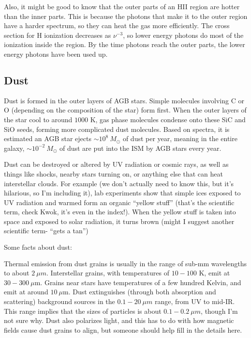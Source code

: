 Also, it might be good to know that the outer parts of an HII region are hotter than the inner 
parts.  This is because the photons that make it to the outer region have a harder spectrum, so 
they can heat the gas more efficiently.  The cross section for H ionization decreases as 
$\nu^{-3}$, so lower energy photons do most of the ionization inside the region.  By the time 
photons reach the outer parts, the lower energy photons have been used up.  

\subsection{Dust}
Dust is formed in the outer layers of AGB stars.  Simple molecules involving 
C or O (depending on the composition of the star) form first.  When the outer 
layers of the star cool to around $1000$ K, gas phase molecules condense onto 
these SiC and SiO seeds, forming more complicated dust molecules.  Based on 
spectra, it is estimated an AGB star ejects $\sim10^8\ M_{\odot}$ of dust 
per year, meaning in the entire galaxy, $\sim10^{-2}\ M_{\odot}$ of dust 
are put into the ISM by AGB stars every year.  

Dust can be destroyed or altered by UV radiation or cosmic rays, as well 
as things like shocks, nearby stars turning on, or anything else that can heat 
interstellar clouds.  For example (we don't actually need to know this, but 
it's hilarious, so I'm including it), lab experiments show that simple ices 
exposed to UV radiation and warmed form an organic ``yellow stuff'' (that's the 
scientific term, check Kwok, it's even in the index!).  When the yellow stuff 
is taken into space and exposed to solar radiation, it turns brown (might I 
suggest another scientific term- ``gets a tan'')

Some facts about dust:

Thermal emission from dust grains is usually in the range of sub-mm wavelengths 
to about $2~\mu m$. Interstellar grains, with temperatures of $10-100$ K, emit
at $30-300\ \mu$m.  Grains near stars have temperatures of a few hundred 
Kelvin, and emit at around $10\ \mu$m.  Dust extinguishes (through both absorption and scattering) background sources in the $0.1-20~\mu m$ range, from UV to mid-IR. This range implies that the sizes of particles is about $0.1-0.2~\mu m$, though I'm not sure why. Dust also polarizes light, and this has to do with how magnetic fields cause dust grains to align, but someone should help fill in the details here.

